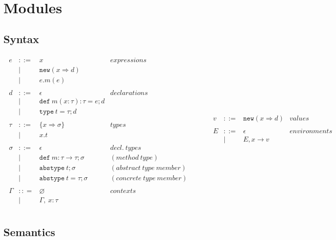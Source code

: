 \documentclass{llncs}
\newcommand{\keywadj}[1]{\mathtt{#1}}
\newcommand{\keyw}[1]{\keywadj{#1}~}
\begin{document}
\section{Modules}

\subsection{Syntax}

\[
\begin{array}{lll}
\begin{array}{lllr}
e & ::= & x & expressions \\
& | & \keywadj{new}(x \Rightarrow d) \\
& | & e.m(e)\\
&&\\
d & ::= & \epsilon & declarations \\
  & |   & \keyw{def} m(x:\tau):\tau = e; d \\
  & |   & \keyw{type} t = \tau; d \\
&&\\
\tau & ::= & \{ x \Rightarrow \sigma \} & types \\
     & |   & x.t \\
&&\\
\sigma & ::= & \epsilon & decl.~ types \\
       & |   & \keyw{def} m:\tau \rightarrow \tau; \sigma & (method~type)\\
       & |   & \keyw{abstype} t; \sigma & (abstract~type~member)\\
       & |   & \keyw{abstype} t = \tau; \sigma & (concrete~type~member) \\
&&\\
\Gamma & :: = & \varnothing & contexts\\
& | & \Gamma,~x : \tau\\
\end{array}
& ~~~~~~
&
\begin{array}{lllr}
v & ::= & \keywadj{new}(x \Rightarrow d) & values\\
&&\\
E & ::= & \epsilon & environments\\
  & |   & E, x \rightarrow v \\
&&\\
\end{array}
\end{array}
\]

\newpage

\subsection{Semantics}
\end{document}
